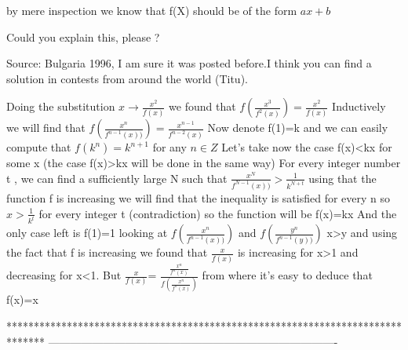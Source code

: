\begin{solution}
	\begin{tcolorbox}by mere inspection we know that f(X) should be of the form $ax+b$\end{tcolorbox}
Could you explain this, please ?
\end{solution}






\begin{solution}
	Source: Bulgaria 1996, I am sure it was posted before.I think you can find a solution in contests from around the world (Titu).
\end{solution}



\begin{solution}
	Doing the substitution $ x \rightarrow \frac{x^2}{f(x)} $ we found that $ f(\frac{x^3}{f^2(x)})= \frac{x^2}{f(x)} $ 
Inductively we will find that $ f( \frac{x^n}{f^{n-1}(x))})= \frac{x^{n-1}}{f^{n-2}(x)} $
Now denote f(1)=k and we can easily compute that $ f(k^n)=k^{n+1} $ for any  $ n\in Z $
Let's take now the case f(x)<kx for some x (the case f(x)>kx will be done in the same way)
For every integer number t , we can find a sufficiently large N such that $ \frac{x^N}{f^{N-1}(x))}> \frac{1}{k^{N+t}} $ using that the function f is increasing we will find that the inequality is satisfied for every n so $ x >\frac{1}{k^t} $ for every integer t (contradiction) so the function will be f(x)=kx
And the only case left is f(1)=1 looking at $ f( \frac{x^n}{f^{n-1}(x))}) $ and $  f( \frac{y^n}{f^{n-1}(y))}) $ x>y and using the fact that f is increasing we found that $ \frac{x}{f(x)} $ is increasing for x>1 and decreasing for x<1. 
But $ \frac{x}{f(x)} $= $ \frac{ \frac{x^n}{f^n(x)}}{f( \frac{x^n}{f^n(x)})} $ from where it's easy to deduce that f(x)=x
\end{solution}
*******************************************************************************
-------------------------------------------------------------------------------

